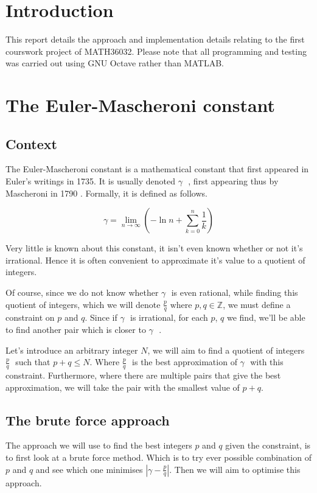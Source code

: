 \documentclass[10pt]{article}
\newcommand*{\gam}{$\gamma \text{ }$}
\newcommand*{\pdivq}{$\frac{p}{q} \text{ }$}
\begin{document}
\section{Introduction}

This report details the approach and implementation details relating to the first courswork project of MATH36032. Please note that all programming and testing was carried out using GNU Octave rather than MATLAB.
\section{The Euler-Mascheroni constant}

\subsection{Context}
The Euler-Mascheroni constant is a mathematical constant that first appeared in Euler's writings in 1735. It is usually denoted \gam, first appearing thus by Mascheroni in 1790 \cite{eulerconst}. Formally, it is defined as follows.

\begin{equation}
\gamma = \lim_{n \to \infty}  \left( -\ln{n} + \sum_{k=0}^{n} \frac{1}{k}  \right)
\end{equation}

Very little is known about this constant, it isn't even known whether or not it's irrational. Hence it is often convenient to approximate it's value to a quotient of integers. 

Of course, since we do not know whether \gam is even rational, while finding this quotient of integers, which we will denote $ \frac{p}{q} \text{ where } p,q \in \mathbb{Z}$, we must define a constraint on $p$ and $q$. Since if \gam is irrational, for each $p$, $q$ we find, we'll be able to find another pair which is closer to \gam. 

Let's introduce an arbitrary integer $N$, we will aim to find a quotient of integers \pdivq such that $p + q \leq N$. Where \pdivq is the best approximation of \gam with this constraint. Furthermore, where there are multiple pairs that give the best approximation, we will take the pair with the smallest value of $p+q$.

\subsection{The brute force approach}

The approach we will use to find the best integers $p$ and $q$ given the constraint, is to first look at a brute force method. Which is to try ever possible combination of $p$ and $q$ and see which one minimises $ | \gamma - \frac{p}{q} |$. Then we will aim to optimise this approach.
\end{document}
